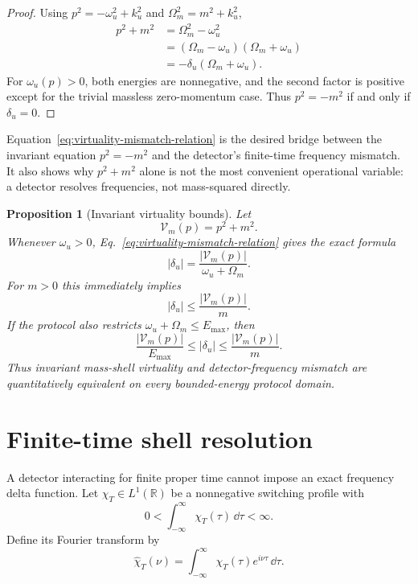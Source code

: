 \documentclass[11pt]{article}
\newtheorem{proposition}{Proposition}
\theoremstyle{remark}
\begin{document}
\begin{proof}
Using $p^2=-\omega_u^2+k_u^2$ and
$\Omega_m^2=m^2+k_u^2$,
\begin{align}
  p^2+m^2
  &=\Omega_m^2-\omega_u^2\\
  &=(\Omega_m-\omega_u)(\Omega_m+\omega_u)\\
  &=-\delta_u(\Omega_m+\omega_u).
\end{align}
For $\omega_u(p)>0$, both energies are nonnegative, and the second factor is positive except for the trivial massless zero-momentum case. Thus $p^2=-m^2$ if and only if $\delta_u=0$.
\end{proof}

Equation~\eqref{eq:virtuality-mismatch-relation} is the desired bridge between the invariant equation $p^2=-m^2$ and the detector's finite-time frequency mismatch. It also shows why $p^2+m^2$ alone is not the most convenient operational variable: a detector resolves frequencies, not mass-squared directly.


\begin{proposition}[Invariant virtuality bounds]
Let
\begin{equation}
 \mathcal V_m(p)=p^2+m^2.
\end{equation}
Whenever $\omega_u>0$, Eq.~\eqref{eq:virtuality-mismatch-relation} gives the exact formula
\begin{equation}
 |\delta_u|=\frac{|\mathcal V_m(p)|}{\omega_u+\Omega_m}.
 \label{eq:virtuality-exact-ratio}
\end{equation}
For $m>0$ this immediately implies
\begin{equation}
 |\delta_u|\le\frac{|\mathcal V_m(p)|}{m}.
 \label{eq:virtuality-upper-mismatch}
\end{equation}
If the protocol also restricts $\omega_u+\Omega_m\le E_{\max}$, then
\begin{equation}
 \frac{|\mathcal V_m(p)|}{E_{\max}}
 \le |\delta_u|
 \le\frac{|\mathcal V_m(p)|}{m}.
 \label{eq:virtuality-two-sided}
\end{equation}
Thus invariant mass-shell virtuality and detector-frequency mismatch are quantitatively equivalent on every bounded-energy protocol domain.
\end{proposition}


\section{Finite-time shell resolution}

A detector interacting for finite proper time cannot impose an exact frequency delta function. Let $\chi_T\in L^1(\mathbb R)$ be a nonnegative switching profile with
\begin{equation}
  0<\int_{-\infty}^{\infty}\chi_T(\tau)\,\dd\tau<\infty.
\end{equation}
Define its Fourier transform by
\begin{equation}
  \widehat\chi_T(\nu)
  =\int_{-\infty}^{\infty}\chi_T(\tau)e^{i\nu\tau}\,\dd\tau.
\end{equation}
\end{document}
